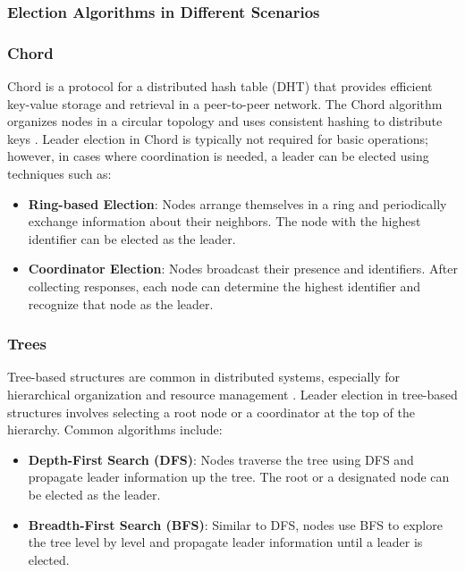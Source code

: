 \subsubsection{Election Algorithms in Different Scenarios}

\subsubsection{Chord}
Chord is a protocol for a distributed hash table (DHT) that provides efficient key-value storage and retrieval in a peer-to-peer network. The Chord algorithm organizes nodes in a circular topology and uses consistent hashing to distribute keys \cite{Ref3}. Leader election in Chord is typically not required for basic operations; however, in cases where coordination is needed, a leader can be elected using techniques such as:

\begin{itemize}
    \item \textbf{Ring-based Election}: Nodes arrange themselves in a ring and periodically exchange information about their neighbors. The node with the highest identifier can be elected as the leader.
    \item \textbf{Coordinator Election}: Nodes broadcast their presence and identifiers. After collecting responses, each node can determine the highest identifier and recognize that node as the leader.
\end{itemize}

\subsubsection{Trees}
Tree-based structures are common in distributed systems, especially for hierarchical organization and resource management \cite{Ref4}. Leader election in tree-based structures involves selecting a root node or a coordinator at the top of the hierarchy. Common algorithms include:

\begin{itemize}
    \item \textbf{Depth-First Search (DFS)}: Nodes traverse the tree using DFS and propagate leader information up the tree. The root or a designated node can be elected as the leader.
    \item \textbf{Breadth-First Search (BFS)}: Similar to DFS, nodes use BFS to explore the tree level by level and propagate leader information until a leader is elected.
\end{itemize}

